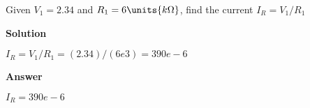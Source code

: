 \question Given \mbox{$V_{1} = 2.34$} and \mbox{$R_{1} = \mbox{$6 \units{k \Omega}$}$}, find the current  $I_R = V_1/R_1$


\begin{solutions}
\textbf{Solution}

\mbox{$I_{R}=V_{1}/R_{1}  = (2.34)/(6e3) = 390e-6$}\\
\end{solutions}


\begin{answers}
\textbf{Answer}

\mbox{$I_{R} = 390e-6$}
\end{answers}

